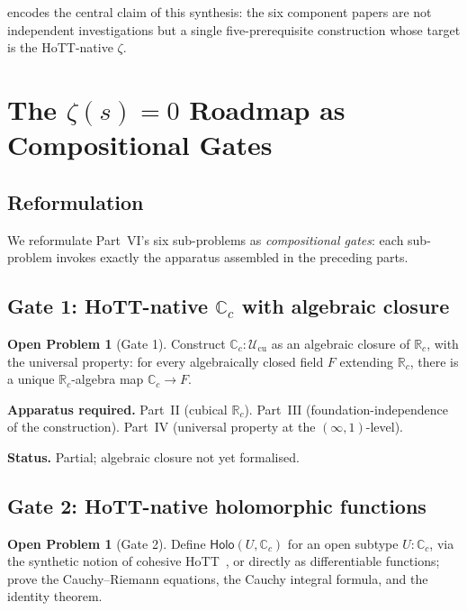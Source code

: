 \documentclass[12pt]{article}
\theoremstyle{definition}
\newtheorem{problem}[theorem]{Open Problem}
\theoremstyle{remark}
\newcommand{\Type}{\mathcal{U}}
\newcommand{\R}{\mathbb{R}}
\newcommand{\C}{\mathbb{C}}
\newcommand{\Rc}{\R_{c}}
\newcommand{\Cc}{\C_{c}}
\newcommand{\holo}{\mathsf{Holo}}
\begin{document}
 encodes the central claim of this synthesis: the six
component papers are not independent investigations but a single
five-prerequisite construction whose target is the HoTT-native $\zeta$.

\section{The \texorpdfstring{$\zeta(s)=0$}{zeta(s)=0} Roadmap as Compositional Gates}\label{sec:zeta-roadmap}

\subsection{Reformulation}

We reformulate Part~VI's six sub-problems as \emph{compositional gates}:
each sub-problem invokes exactly the apparatus assembled in the
preceding parts.

\subsection{Gate 1: HoTT-native \texorpdfstring{$\Cc$}{Cc} with algebraic closure}

\begin{problem}[Gate 1]\label{prob:gate1}
Construct $\Cc : \Type_{\mathrm{cu}}$ as an algebraic closure of $\Rc$,
with the universal property: for every algebraically closed field $F$
extending $\Rc$, there is a unique $\Rc$-algebra map $\Cc \to F$.
\end{problem}

\textbf{Apparatus required.} Part~II (cubical $\Rc$). Part~III
(foundation-independence of the construction). Part~IV (universal
property at the $(\infty,1)$-level).

\textbf{Status.} Partial; algebraic closure not yet formalised.

\subsection{Gate 2: HoTT-native holomorphic functions}

\begin{problem}[Gate 2]\label{prob:gate2}
Define $\holo(U, \Cc)$ for an open subtype $U : \Cc$, via the synthetic
notion of cohesive HoTT~\cite{shulman-cohesive,coalgebraicTranscendentals},
or directly as differentiable functions; prove the Cauchy--Riemann
equations, the Cauchy integral formula, and the identity theorem.
\end{problem}
\end{document}
